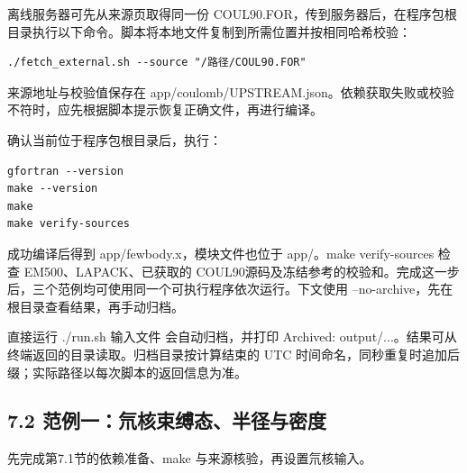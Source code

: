 \documentclass[UTF8,a4paper,zihao=5,fontset=fandol]{ctexart}
\begin{document}
离线服务器可先从来源页取得同一份 {\ttfamily\small COUL90.\allowbreak{}FOR}，传到服务器后，在程序包根目录执行以下命令。脚本将本地文件复制到所需位置并按相同哈希校验：


\begin{Verbatim}[samepage=true,breaklines=true,breakanywhere=true,fontsize=\small,frame=leftline,framesep=3mm,rulecolor=\color{bluegray}]
./fetch_external.sh --source "/路径/COUL90.FOR"
\end{Verbatim}
来源地址与校验值保存在 {\ttfamily\small app/\allowbreak{}coulomb/\allowbreak{}UPSTREAM.\allowbreak{}json}。依赖获取失败或校验不符时，应先根据脚本提示恢复正确文件，再进行编译。

确认当前位于程序包根目录后，执行：


\begin{Verbatim}[samepage=true,breaklines=true,breakanywhere=true,fontsize=\small,frame=leftline,framesep=3mm,rulecolor=\color{bluegray}]
gfortran --version
make --version
make
make verify-sources
\end{Verbatim}
成功编译后得到 {\ttfamily\small app/\allowbreak{}fewbody.\allowbreak{}x}，模块文件也位于 {\ttfamily\small app/\allowbreak{}}。{\ttfamily\small make verify-sources} 检查 EM500、LAPACK、已获取的 COUL90源码及冻结参考的校验和。完成这一步后，三个范例均可使用同一个可执行程序依次运行。下文使用 {\ttfamily\small --no-archive}，先在根目录查看结果，再手动归档。

直接运行 {\ttfamily\small .\allowbreak{}/\allowbreak{}run.\allowbreak{}sh 输入文件} 会自动归档，并打印 {\ttfamily\small Archived: output/\allowbreak{}.\allowbreak{}.\allowbreak{}.\allowbreak{}}。结果可从终端返回的目录读取。归档目录按计算结束的 UTC 时间命名，同秒重复时追加后缀；实际路径以每次脚本的返回信息为准。

\subsection*{7.2 范例一：氘核束缚态、半径与密度}
先完成第7.1节的依赖准备、{\ttfamily\small make} 与来源核验，再设置氘核输入。
\end{document}
